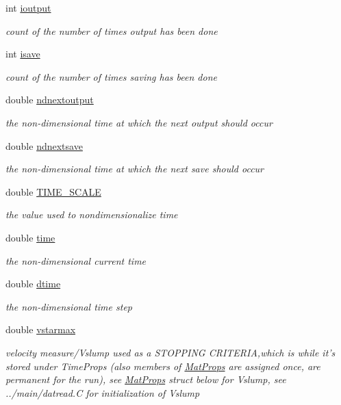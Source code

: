 \begin{CompactItemize}
int \hyperlink{structTimeProps_o6}{ioutput}
\begin{CompactList}\small\item\em count of the number of times output has been done \item\end{CompactList}\item 
int \hyperlink{structTimeProps_o7}{isave}
\begin{CompactList}\small\item\em count of the number of times saving has been done \item\end{CompactList}\item 
double \hyperlink{structTimeProps_o8}{ndnextoutput}
\begin{CompactList}\small\item\em the non-dimensional time at which the next output should occur \item\end{CompactList}\item 
double \hyperlink{structTimeProps_o9}{ndnextsave}
\begin{CompactList}\small\item\em the non-dimensional time at which the next save should occur \item\end{CompactList}\item 
double \hyperlink{structTimeProps_o10}{TIME\_\-SCALE}
\begin{CompactList}\small\item\em the value used to nondimensionalize time \item\end{CompactList}\item 
double \hyperlink{structTimeProps_o11}{time}
\begin{CompactList}\small\item\em the non-dimensional current time \item\end{CompactList}\item 
double \hyperlink{structTimeProps_o12}{dtime}
\begin{CompactList}\small\item\em the non-dimensional time step \item\end{CompactList}\item 
double \hyperlink{structTimeProps_o13}{vstarmax}
\begin{CompactList}\small\item\em velocity measure/Vslump used as a STOPPING CRITERIA,which is while it's stored under Time\-Props (also members of \hyperlink{structMatProps}{Mat\-Props} are assigned once, are permanent for the run), see \hyperlink{structMatProps}{Mat\-Props} struct below for Vslump, see ../main/datread.C for initialization of Vslump \item\end{CompactList}\item 

\end{CompactItemize}
